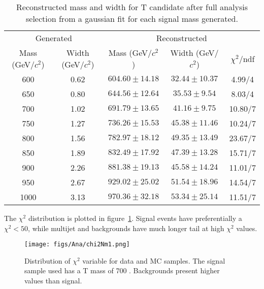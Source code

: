\begin{table*}[htbH]
\begin{center}
\begin{tabular}{|c|c|c|c|c|}
\hline 
\multicolumn{2}{|c}{Generated} & \multicolumn{3}{|c|}{Reconstructed} \\
Mass (GeV/$c^{2}$) & Width (GeV/$c^{2}$) & Mass (GeV/$c^{2}$) & Width (GeV/$c^{2}$) & $\chi^{2} /$ndf\\
\hline
600 & 0.62 &$604.60\pm14.18$ & $32.44\pm10.37$ & 4.99/4\\
650 & 0.80 &$644.56\pm12.64$ & $35.53\pm9.54$ & 8.03/4\\
700 & 1.02 &$691.79\pm13.65$ & $41.16\pm9.75$ & 10.80/7\\
750 & 1.27 &$736.26\pm15.53$ & $45.38\pm11.46$ & 10.24/7\\
800 & 1.56 &$782.97\pm18.12$ & $49.35\pm13.49$ & 23.67/7\\
850 & 1.89 &$832.49\pm17.92$ & $47.39\pm13.28$ & 15.71/7\\
900 & 2.26 &$881.38\pm19.13$ & $45.58\pm14.24$ & 11.01/7\\
950 & 2.67 &$929.02\pm25.02$ & $51.54\pm18.96$ & 14.54/7\\
1000 & 3.13 &$970.36\pm32.18$ & $53.34\pm25.14$ & 11.51/7\\
\hline
\end{tabular}
\caption{Reconstructed mass and width for T candidate after full analysis selection from a gaussian fit for each signal mass generated. \label{tab:SignalWidths}}
\end{center}
\end{table*}

The $\chi^{2}$ distribution is plotted in figure~\ref{fig:chi2}. Signal events have preferentially a $\chi^{2}<50$, while multijet and \ttbar backgrounds have much longer tail at high $\chi^{2}$ values.

\begin{figure}[!Hhtbp]
  \begin{center}
    \texttt{[image: figs/Ana/chi2Nm1.png]}
    \caption{Distribution of $\chi^{2}$ variable for data and MC samples. The signal sample used has a T mass of 700 \GeVcc. Backgrounds present higher values than signal.}
    \label{fig:chi2}
  \end{center}
\end{figure}

